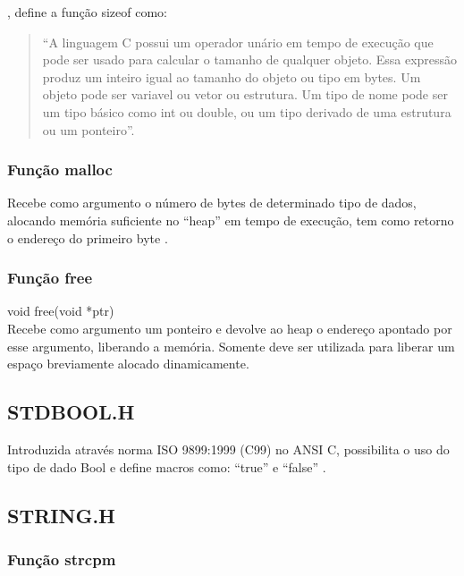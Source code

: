 \documentclass[12pt]{article}
\begin{document}
  \cite{kernighan1988c}, define a função sizeof como:
\begin{quotation}

``A linguagem C possui um operador unário em tempo de execução que pode ser usado para calcular
o tamanho de qualquer objeto. Essa expressão produz um inteiro igual ao tamanho do 
objeto ou tipo em bytes. Um objeto pode ser variavel ou vetor ou estrutura. Um tipo de nome
pode ser um tipo básico como int ou double, ou um tipo derivado de uma estrutura ou um ponteiro''.
\end{quotation}



\subsubsection{Função malloc}

Recebe como argumento o número de bytes de determinado tipo de dados, alocando memória suficiente no ``heap'' em tempo
de execução, tem como retorno o endereço do primeiro byte \cite{schildt:96}.

\subsubsection{Função free}

void free(void *ptr)\\
Recebe como argumento um ponteiro e devolve ao heap o endereço apontado por esse argumento, liberando a memória.
Somente deve ser utilizada para liberar um espaço breviamente alocado dinamicamente\cite{schildt:96}. 

\subsection{STDBOOL.H}

Introduzida através norma ISO 9899:1999 (C99) no ANSI C, possibilita o uso do tipo de dado Bool e define macros como: ``true'' e ``false'' \cite{stroustrup2002sibling}. 

\subsection{STRING.H}

\subsubsection{Função strcpm}
\end{document}
